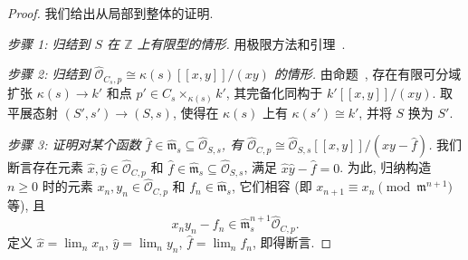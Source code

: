 \begin{proof}
我们给出从局部到整体的证明.

\textit{步骤 1: 归结到 $S$ 在 $\mathbb Z$ 上有限型的情形.} 用极限方法和引理~.

\textit{步骤 2: 归结到 $\widehat{\mathcal O}_{C_s,\allowbreak p}\cong\kappa(s)[[x,\allowbreak y]]/(xy)$ 的情形.} 由命题~, 存在有限可分域扩张 $\kappa(s)\to\allowbreak k'$ 和点 $p'\in C_s\times_{\kappa(s)}k'$, 其完备化同构于 $k'[[x,\allowbreak y]]/(xy)$. 取平展态射 $(S',\allowbreak s')\to(S,\allowbreak s)$, 使得在 $\kappa(s)$ 上有 $\kappa(s')\cong k'$, 并将 $S$ 换为 $S'$.

\textit{步骤 3: 证明对某个函数 $\widehat f\in\widehat{\mathfrak m}_s\subseteq\widehat{\mathcal O}_{S,\allowbreak s}$, 有 $\widehat{\mathcal O}_{C,\allowbreak p}\cong\widehat{\mathcal O}_{S,\allowbreak s}[[x,\allowbreak y]]/(xy-\widehat f)$.} 我们断言存在元素 $\widehat x,\allowbreak \widehat y\in\widehat{\mathcal O}_{C,\allowbreak p}$ 和 $\widehat f\in\widehat{\mathfrak m}_s\subseteq\widehat{\mathcal O}_{S,\allowbreak s}$, 满足 $\widehat x\widehat y-\widehat f=0$. 为此, 归纳构造 $n\geq0$ 时的元素 $x_n,\allowbreak y_n\in\widehat{\mathcal O}_{C,\allowbreak p}$ 和 $f_n\in\widehat{\mathfrak m}_s$, 它们相容 (即 $x_{n+1}\equiv x_n\pmod{\mathfrak m^{n+1}}$ 等), 且
\begin{equation}\label{src:6.2.29}
x_ny_n-f_n\in\widehat{\mathfrak m}_s^{n+1}\widehat{\mathcal O}_{C,p}.
\end{equation}
定义 $\widehat x=\lim_n x_n$, $\widehat y=\lim_n y_n$, $\widehat f=\lim_n f_n$, 即得断言.


\end{proof}
